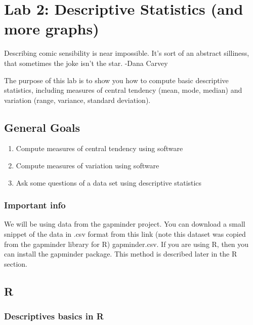 \documentclass[
]{book}
\providecommand{\tightlist}{%
  \setlength{\itemsep}{0pt}\setlength{\parskip}{0pt}}
\begin{document}
\hypertarget{lab-2-descriptive-statistics-and-more-graphs}{%
\chapter{Lab 2: Descriptive Statistics (and more graphs)}\label{lab-2-descriptive-statistics-and-more-graphs}}

{
Describing comic sensibility is near impossible. It's sort of an abstract silliness, that sometimes the joke isn't the star.
-Dana Carvey
}

The purpose of this lab is to show you how to compute basic descriptive statistics, including measures of central tendency (mean, mode, median) and variation (range, variance, standard deviation).

\hypertarget{general-goals-1}{%
\section{General Goals}\label{general-goals-1}}

\begin{enumerate}
\def\labelenumi{\arabic{enumi}.}
\tightlist
\item
  Compute measures of central tendency using software
\item
  Compute measures of variation using software
\item
  Ask some questions of a data set using descriptive statistics
\end{enumerate}

\hypertarget{important-info-1}{%
\subsection{Important info}\label{important-info-1}}

We will be using data from the gapminder project. You can download a small snippet of the data in .csv format from this link (note this dataset was copied from the gapminder library for R) gapminder.csv. If you are using R, then you can install the gapminder package. This method is described later in the R section.

\hypertarget{r-2}{%
\section{R}\label{r-2}}

\hypertarget{descriptives-basics-in-r}{%
\subsection{Descriptives basics in R}\label{descriptives-basics-in-r}}
\end{document}
